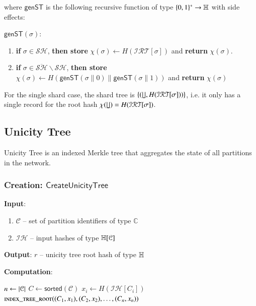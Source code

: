 where $\mathsf{genST}$ is the following recursive function of type $\{0,1\}^{\ast}\to \mathbb{H}$ with side effects:
\medskip

$\mathsf{genST}(\sigma)$:
\begin{enumerate}
	\item \textbf{if} $\sigma\in \mathcal{SH}$, \textbf{then store}  $\chi(\sigma) \gets H(\mathcal{IRT}[\sigma])$ and \textbf{return} $\chi(\sigma)$.
	\item\textbf{if} $\sigma\in \overline{\mathcal{SH}}\backslash\mathcal{SH}$, \textbf{then store}
		$\chi(\sigma) \gets H(\mathsf{genST}(\sigma\| 0) \mathbin{\|} \mathsf{genST}(\sigma\| 1))$ and \textbf{return} $\chi(\sigma)$
\end{enumerate}

For the single shard case, the shard tree is $\{(\lfloor\!\rfloor, H(\mathcal{IRT}[\sigma]))\}$, i.e. it only has a single record for the root hash $\chi(\lfloor\!\rfloor)=H(\mathcal{IRT}[\sigma])$.

\subsection{Unicity Tree}

Unicity Tree is an indexed Merkle tree that aggregates the state of all partitions in the network.

\subsubsection{Creation: $\mathsf{CreateUnicityTree}$}\label{se:create-unicity-tree}

\textbf{Input}:
\begin{enumerate}
	\item $\mathcal{C}$ -- set of partition identifiers of type $\mathbb{C}$
	\item $\mathcal{IH}$ -- input hashes of type $\mathbb{H}[\mathcal{C}]$
\end{enumerate}
\textbf{Output}: $r$ -- unicity tree root hash of type $\mathbb{H}$

\textbf{Computation}:
\begin{algorithmic}
	\State $n \gets \left|\mathcal{C}\right|$ 
	\State $C \gets \mathsf{sorted}(\mathcal{C})$ 
		\State $x_i \gets H(\mathcal{IH}[C_i])$
	\EndFor
	\State \Return $\Call{\textsc{index\_tree\_root}}{(C_1, x_1), (C_2, x_2), \ldots, (C_n, x_n)}$ 
\end{algorithmic}

